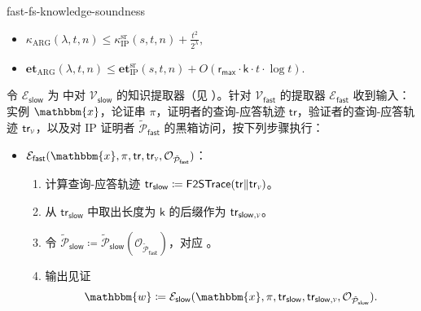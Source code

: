 \documentclass[american,singlepageview]{snargs-book-zh}
\newcommand{\Malicious}[1]{\tilde{#1}}
\newcommand{\DefineEqual}{\coloneqq}
\newcommand{\concat}{\|}
\newcommand{\BlackBox}[1]{\mathcal{O}_{#1}}
\newcommand{\Instance}{\mathbbm{x}}
\newcommand{\Witness}{\mathbbm{w}}
\newcommand{\InstanceSize}{n}
\newcommand{\ProtoProver}{P}
\newcommand{\ProtoVerifier}{V}
\newcommand{\ProtoExtractor}{E}
\newcommand{\ProtoKnowledgeError}{\kappa}
\newcommand{\ProtoKnowledgeTime}{\mathbf{et}}
\newcommand{\ProtoRoundComplexity}{\mathsf{k}}
\newcommand{\ProtoRandomnessComplexity}{\mathsf{r}}
\newcommand{\SRSuperscript}{\mathrm{sr}}
\newcommand{\ProtoSRKnowledgeError}{\ProtoKnowledgeError^{\SRSuperscript}}
\newcommand{\IPSubscript}{\scriptscriptstyle\mathrm{IP}}
\newcommand{\IPRoundComplexity}{\ProtoRoundComplexity}
\newcommand{\IPRandomnessComplexity}{\ProtoRandomnessComplexity}
\newcommand{\IPMaxRandomnessComplexity}{\IPRandomnessComplexity_{{\scriptscriptstyle\mathsf{max}}}}
\newcommand{\ARGSubscript}{\scriptscriptstyle\mathrm{ARG}}
\newcommand{\ARGFormat}[1]{\mathcal{#1}}
\newcommand{\ARGProver}{\ARGFormat{\ProtoProver}}
\newcommand{\ARGVerifier}{\ARGFormat{\ProtoVerifier}}
\newcommand{\ARGExtractor}{\ARGFormat{\ProtoExtractor}}
\newcommand{\ARGKnowledgeTime}{\ProtoKnowledgeTime_{\ARGSubscript}}
\newcommand{\ARGString}{\pi}
\newcommand{\ARGKnowledgeError}{\ProtoKnowledgeError_{\ARGSubscript}}
\newcommand{\ROQueryBound}{t}
\newcommand{\SecurityParameter}{\lambda}
\newcommand{\PrivacyParameter}{s}
\newcommand{\ROTrace}{\mathsf{tr}}
\newcommand{\ROTraceVerifier}{\ROTrace_{\scalebox{0.5}{$\ARGVerifier$}}}
\newcommand{\ROTraceVerifierSlow}{\ROTrace_{\SlowFSSymbol,\scalebox{0.5}{$\ARGVerifier$}}}
\newcommand{\SlowFSSymbol}{\mathsf{slow}}
\newcommand{\FastFSSymbol}{\mathsf{fast}}
\newcommand{\SlowFSMaliciousProver}{\Malicious{\ARGProver}_{\SlowFSSymbol}}
\newcommand{\FastFSMaliciousProver}{\Malicious{\ARGProver}_{\FastFSSymbol}}
\newcommand{\FastTraceToSlowTrace}{\mathsf{F2STrace}}
\newcommand{\FastTraceToSlowTraceTime}{O(\IPMaxRandomnessComplexity \cdot \IPRoundComplexity \cdot \ROQueryBound \cdot \log \ROQueryBound)}
\newcommand{\IPSRKnowledgeError}{\ProtoSRKnowledgeError_{\IPSubscript}}
\newcommand{\IPSRKnowledgeTime}{\ProtoKnowledgeTime_{\IPSubscript}^{\SRSuperscript}}
\newcommand{\FSErrorExpression}[1][\ROQueryBound]{\frac{#1^2}{2^{\SecurityParameter}}}
\begin{document}
\begin{ImportantTheorem}{}{fast-fs-knowledge-soundness}
\begin{itemize}[nolistsep]
  \item 
  $\displaystyle
  \ARGKnowledgeError(\SecurityParameter,\ROQueryBound,\InstanceSize)
  \le
  \IPSRKnowledgeError(\PrivacyParameter,\ROQueryBound,\InstanceSize)
  + \FSErrorExpression,
  $
  \item 
  $\displaystyle
  \ARGKnowledgeTime(\SecurityParameter,\ROQueryBound,\InstanceSize)
  \le
  \IPSRKnowledgeTime(\PrivacyParameter,\ROQueryBound,\InstanceSize)
  + \FastTraceToSlowTraceTime.
  $
\end{itemize}
\end{ImportantTheorem}

\begin{construction}
\label{construction:fast-fs-extractor}
令 $\ARGExtractor_{\SlowFSSymbol}$ 为  中对 $\ARGVerifier_{\SlowFSSymbol}$ 的知识提取器（见 ）。针对 $\ARGVerifier_{\FastFSSymbol}$ 的提取器 $\ARGExtractor_{\FastFSSymbol}$ 收到输入：实例 $\Instance$，论证串 $\ARGString$，证明者的查询-应答轨迹 $\ROTrace$，验证者的查询-应答轨迹 $\ROTraceVerifier$，以及对 IP 证明者 $\FastFSMaliciousProver$ 的黑箱访问，按下列步骤执行：
\begin{itemize}[noitemsep]
\item[] $\ARGExtractor_{\FastFSSymbol}(\Instance,\ARGString,\ROTrace,\ROTraceVerifier,\BlackBox{\FastFSMaliciousProver})$：
\begin{enumerate}[nolistsep]
  \item 计算查询-应答轨迹 $\ROTrace_{\SlowFSSymbol} \DefineEqual \FastTraceToSlowTrace(\ROTrace \concat \ROTraceVerifier)$。
  \item 从 $\ROTrace_{\SlowFSSymbol}$ 中取出长度为 $\IPRoundComplexity$ 的后缀作为 $\ROTraceVerifierSlow$。
  \item 令 $\SlowFSMaliciousProver \DefineEqual \SlowFSMaliciousProver(\BlackBox{\FastFSMaliciousProver})$，对应 。
  \item 输出见证
  \[
  \Witness
  \DefineEqual
  \ARGExtractor_{\SlowFSSymbol}
    (\Instance,\ARGString,\ROTrace_{\SlowFSSymbol},\ROTraceVerifierSlow,\BlackBox{\SlowFSMaliciousProver}).
  \]
\end{enumerate}
\end{itemize}
\end{construction}
\end{document}
